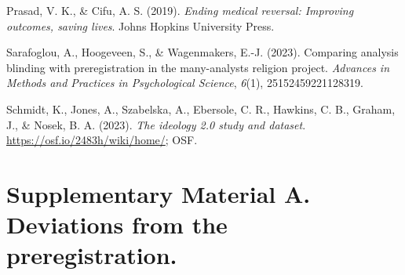 \documentclass[
  man,floatsintext]{apa6}
\newlength{\cslhangindent}
\newlength{\cslentryspacingunit} %
\newenvironment{CSLReferences}[2] %
 {%
  \setlength{\parindent}{0pt}
  \ifodd #1
  \let\oldpar\par
  \def\par{\hangindent=\cslhangindent\oldpar}
  \fi
  \setlength{\parskip}{#2\cslentryspacingunit}
 }%
 {}
\begin{document}
\begin{CSLReferences}{1}{0}
\leavevmode{}%
Prasad, V. K., \& Cifu, A. S. (2019). \emph{Ending medical reversal: Improving outcomes, saving lives}. Johns Hopkins University Press.

\leavevmode{}%
Sarafoglou, A., Hoogeveen, S., \& Wagenmakers, E.-J. (2023). Comparing analysis blinding with preregistration in the many-analysts religion project. \emph{Advances in Methods and Practices in Psychological Science}, \emph{6}(1), 25152459221128319.

\leavevmode{}%
Schmidt, K., Jones, A., Szabelska, A., Ebersole, C. R., Hawkins, C. B., Graham, J., \& Nosek, B. A. (2023). \emph{The ideology 2.0 study and dataset}. \url{https://osf.io/2483h/wiki/home/}; OSF.

\end{CSLReferences}

\newpage

\hypertarget{appendix-appendix}{%
\appendix}


\hypertarget{supplementary-material-a.-deviations-from-the-preregistration.}{%
\section{Supplementary Material A. Deviations from the preregistration.}\label{supplementary-material-a.-deviations-from-the-preregistration.}}
\end{document}
